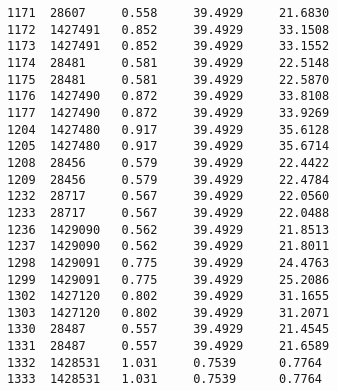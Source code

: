 \documentclass[notitlepage,rmp,aps,10pt]{revtex4-1}
\begin{document}
\begin{verbatim}
1171  28607     0.558     39.4929     21.6830
1172  1427491   0.852     39.4929     33.1508
1173  1427491   0.852     39.4929     33.1552
1174  28481     0.581     39.4929     22.5148
1175  28481     0.581     39.4929     22.5870
1176  1427490   0.872     39.4929     33.8108
1177  1427490   0.872     39.4929     33.9269
1204  1427480   0.917     39.4929     35.6128
1205  1427480   0.917     39.4929     35.6714
1208  28456     0.579     39.4929     22.4422
1209  28456     0.579     39.4929     22.4784
1232  28717     0.567     39.4929     22.0560
1233  28717     0.567     39.4929     22.0488
1236  1429090   0.562     39.4929     21.8513
1237  1429090   0.562     39.4929     21.8011
1298  1429091   0.775     39.4929     24.4763
1299  1429091   0.775     39.4929     25.2086
1302  1427120   0.802     39.4929     31.1655
1303  1427120   0.802     39.4929     31.2071
1330  28487     0.557     39.4929     21.4545
1331  28487     0.557     39.4929     21.6589
1332  1428531   1.031     0.7539      0.7764
1333  1428531   1.031     0.7539      0.7764
\end{verbatim}

\newpage

\end{document}
